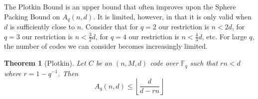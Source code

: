\documentclass{article}
\newtheorem{theorem}{Theorem}
\numberwithin{theorem}{subsection}
\begin{document}
The Plotkin Bound is an upper bound that often improves upon the Sphere Packing Bound on $A_q(n,d)$.  It is limited, however, in that it is only valid when $d$ is sufficiently
close to $n$.  Consider that for $q=2$ our restriction is $n<2d$,  for $q=3$ our restriction is $n<\frac{3}{2}d$, for $q=4$ our restriction is $n<\frac{4}{3}d$, etc.  For large $q$, the
number of codes we can consider becomes increasingly limited.

\begin{theorem}[Plotkin]
Let $C$ be an $(n,M,d)$ code over $\mathbb{F}_q$ such that $rn < d$ where $r = 1 - q^{-1}$.  Then
\begin{equation}
A_q(n,d) \le \left \lfloor \frac{d}{d-rn}\right\rfloor
\end{equation}
\end{theorem}
\end{document}
